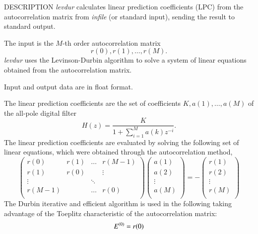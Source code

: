 \begin{qsection}{DESCRIPTION}
{\em levdur} calculates linear prediction coefficients (LPC) 
from the autocorrelation matrix from {\em infile} (or standard input), 
sending the result to standard output.

The input is the $M$-th order autocorrelation matrix
\begin{displaymath}
  r(0),r(1),\dots,r(M).
\end{displaymath}
{\em levdur} uses the Levinson-Durbin algorithm 
to solve a system of linear equations
obtained from the autocorrelation matrix.

Input and output data are in float format.
\par
The linear prediction coefficients are the set of coefficients
$K, a(1), \dots, a(M)$ of the all-pole digital filter
\begin{displaymath}
H(z) = \frac{K}{\displaystyle{1+\sum_{i=1}^{M}a(k)z^{-i}}}.
\end{displaymath}
The linear prediction coefficients are evaluated by solving
the following set of linear equations, which were obtained
through the autocorrelation method,
\begin{displaymath}
\begin{pmatrix}
        r(0) & r(1) & \dots & r(M-1) \\
        r(1) & r(0) &        & \vdots \\
        \vdots &    & \ddots &         \\
        r(M-1) &    & \dots & r(0)   \\
\end{pmatrix}
\begin{pmatrix}
	a(1) \\
	a(2) \\
	\vdots \\
	a(M) \\
\end{pmatrix}
= - 
\begin{pmatrix}
	r(1) \\
	r(2) \\
	\vdots \\
	r(M) \\
\end{pmatrix}
\end{displaymath}
The Durbin iterative and efficient algorithm is used
in the following taking advantage of the Toeplitz characteristic
of the autocorrelation matrix:
\begin{align}
E^{(0)}    &= r(0) \notag \\

\end{align}
\end{qsection}
